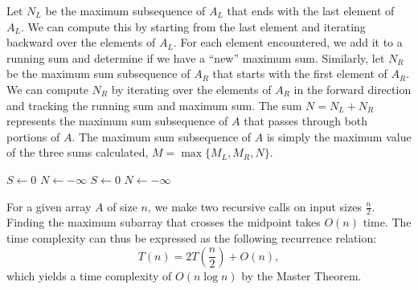 \documentclass[11pt]{article}
\begin{document}
Let $N_L$ be the maximum subsequence of $A_L$ that ends with the last element of $A_L$. We can compute this by starting from the last element and iterating backward over the elements of $A_L$. For each element encountered, we add it to a running sum and determine if we have a ``new'' maximum sum. Similarly, let $N_R$ be the maximum sum subsequence of $A_R$ that starts with the first element of $A_R$. We can compute $N_R$ by iterating over the elements of $A_R$ in the forward direction and tracking the running sum and maximum sum. The sum $N = N_L + N_R$ represents the maximum sum subsequence of $A$ that passes through both portions of $A$. The maximum sum subsequence of $A$ is simply the maximum value of the three sums calculated, $M = \max \{M_L, M_R, N\}$.

\IncMargin{2em}
\begin{algorithm}[H]
    \footnotesize
    \DontPrintSemicolon
    \BlankLine
     {
        $S \gets 0$ 
        $N \gets -\infty$ 
        \BlankLine
        \BlankLine
    }
    \BlankLine
     {
        $S \gets 0$ 
        $N \gets -\infty$ 
        \BlankLine
        \BlankLine
    }
    \BlankLine
\end{algorithm}\DecMargin{2em} 
For a given array $A$ of size $n$, we make two recursive calls on input sizes $\frac{n}{2}$. Finding the maximum subarray that crosses the midpoint takes $O(n)$ time. The time complexity can thus be expressed as the following recurrence relation:
\begin{equation}
    T(n) = 2T \left(\frac{n}{2}\right) + O(n), 
\end{equation}
which yields a time complexity of $O(n \log n)$ by the Master Theorem.
\end{document}
